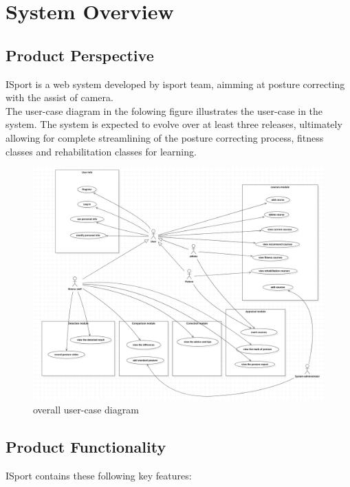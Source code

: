 \documentclass[16pt]{scrreprt}
\begin{document}

\chapter{System Overview}
\section{Product Perspective}

ISport is a web system developed by isport team, aimming at posture correcting with the assist of camera.\\

The user-case diagram in the folowing figure illustrates the user-case in the system. The system is expected to evolve over at least three releases, ultimately allowing for complete streamlining of the posture correcting process, fitness classes and rehabilitation classes for learning.

\begin{figure}[H]
	\centering
	\includegraphics[width=1.0\textwidth]{diagrams/big-user-case.png}
	\caption{overall user-case diagram}
\end{figure}



\section{Product Functionality}

ISport contains these following key features:\\
\end{document}
